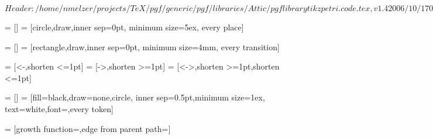 %
%
%

\ProvidesFileRCS[v\pgfversion] $Header: /home/nmelzer/projects/TeX/pgf/generic/pgf/libraries/Attic/pgflibrarytikzpetri.code.tex,v 1.4 2006/10/17 08:16:28 tantau Exp $



=           []
=                 [circle,draw,inner sep=0pt,
                                    minimum size=5ex,
                                    every place]



=      []
=            [rectangle,draw,inner sep=0pt,
                                    minimum size=4mm,
                                    every transition]



=                   [<-,shorten <=1pt]
=                  [->,shorten >=1pt]
=          [<->,shorten >=1pt,shorten <=1pt]




=           []
=                 [fill=black,draw=none,circle,
                                    inner sep=0.5pt,minimum size=1ex,
                                    text=white,font=\pgfutil@font@tiny,every token]

\def\tikz@token@distance{1.5ex}

=   [growth function=\tikz@grow@tokens,edge from parent path=]





